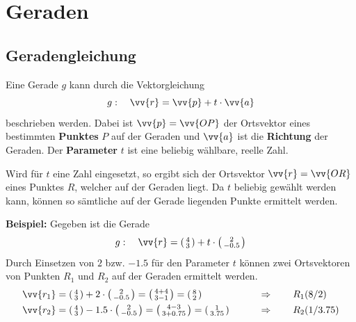 \newpage
\section{Geraden}

\subsection{Geradengleichung}
Eine Gerade $g$ kann durch die Vektorgleichung
\[
  g:\quad \vv{r} = \vv{p} + t\cdot \vv{a}
\]
beschrieben werden. Dabei ist $\vv{p} = \vv{OP}$ der Ortsvektor eines bestimmten
\textbf{Punktes} $P$ auf der Geraden und $\vv{a}$ ist die \textbf{Richtung} der
Geraden. Der \textbf{Parameter} $t$ ist eine beliebig wählbare, reelle Zahl.

Wird für $t$ eine Zahl eingesetzt, so ergibt sich der Ortsvektor
$\vv{r} = \vv{OR}$ eines Punktes $R$, welcher auf der Geraden liegt. Da $t$
beliebig gewählt werden kann, können so sämtliche auf der Gerade liegenden
Punkte ermittelt werden.
\begin{center}
\end{center}
\begin{example}
  \textbf{Beispiel:} Gegeben ist die Gerade
  \[
    g:\quad \vv{r} = \tvec{4,3}+t\cdot \tvec{2,-0.5}
  \]
  Durch Einsetzen von $2$ bzw. $-1.5$ für den Parameter $t$ können zwei
  Ortsvektoren von Punkten $R_{1}$ und $R_{2}$ auf der Geraden ermittelt werden.
  \begin{align*}
    \vv{r_{1}} &= \tvec{4,3}+2\cdot \tvec{2,-0.5} = \tvec{4+4,3-1} = \tvec{8,2} \qquad&&\Rightarrow\qquad \coord[R_{1}]{8,2} \\
    \vv{r_{2}} &= \tvec{4,3}-1.5\cdot \tvec{2,-0.5} = \tvec{4-3,3+0.75} = \tvec{1,3.75} \qquad&&\Rightarrow\qquad \coord[R_{2}]{1,3.75}
  \end{align*}
\end{example}

